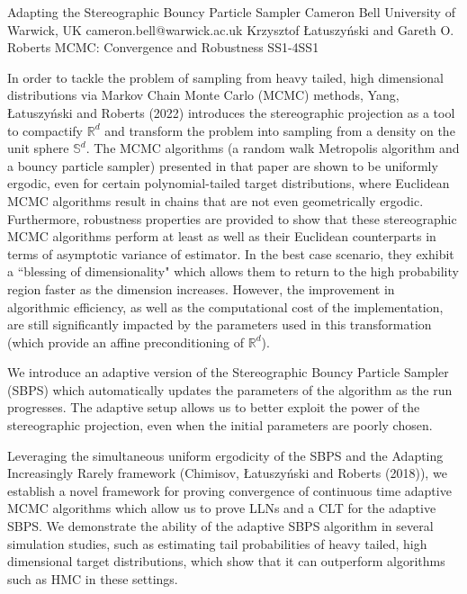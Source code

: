 \begin{talk}
  {Adapting the Stereographic Bouncy Particle Sampler}%
  {Cameron Bell}%
  {University of Warwick, UK}%
  {cameron.bell@warwick.ac.uk}%
  {Krzysztof {\L}atuszy{\'n}ski and Gareth O. Roberts}%
{MCMC: Convergence and Robustness}
{}{SS1-4}{SS1}

			

In order to tackle the problem of sampling from heavy tailed, high dimensional distributions via Markov Chain Monte Carlo (MCMC) methods, Yang, {\L}atuszy{\'n}ski and Roberts (2022) introduces the stereographic projection as a tool to compactify $\mathbb{R}^d$ and transform the problem into sampling from a density on the unit sphere $\mathbb{S}^d$. The MCMC algorithms (a random walk Metropolis algorithm and a bouncy particle sampler) presented in that paper are shown to be uniformly ergodic, even for certain polynomial-tailed target distributions, where Euclidean MCMC algorithms result in chains that are not even geometrically ergodic. Furthermore, robustness properties are provided to show that these stereographic MCMC algorithms perform at least as well as their Euclidean counterparts in terms of asymptotic variance of estimator. In the best case scenario, they exhibit a ``blessing of dimensionality" which allows them to return to the high probability region faster as the dimension increases. However, the improvement in algorithmic efficiency, as well as the computational cost of the implementation, are still significantly impacted by the parameters used in this transformation (which provide an affine preconditioning of $\mathbb{R}^d$).

We introduce an adaptive version of the Stereographic Bouncy Particle Sampler (SBPS) which automatically updates the parameters of the algorithm as the run progresses. The adaptive setup allows us to better exploit the power of the stereographic projection, even when the initial parameters are poorly chosen.

Leveraging the simultaneous uniform ergodicity of the SBPS and the Adapting Increasingly Rarely framework (Chimisov, {\L}atuszy{\'n}ski and Roberts (2018)), we establish a novel framework for proving convergence of continuous time adaptive MCMC algorithms which allow us to prove LLNs and a CLT for the adaptive SBPS. We demonstrate the ability of the adaptive SBPS algorithm in several simulation studies, such as estimating tail probabilities of heavy tailed, high dimensional target distributions, which show that it can outperform algorithms such as HMC in these settings.


\end{talk}
